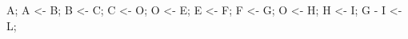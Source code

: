 	\rootCommit A;
	\commit A <- B;
	\commit B <- C;
	\commit C <- O;
	\upCommit O <- E;
	\commit E <- F;
	\commit F <- G;
	\downCommit O <- H;
	\commit H <- I;
	\mergeCommitInTheMiddle G - I <- L;
\finefiguranofloattikz
